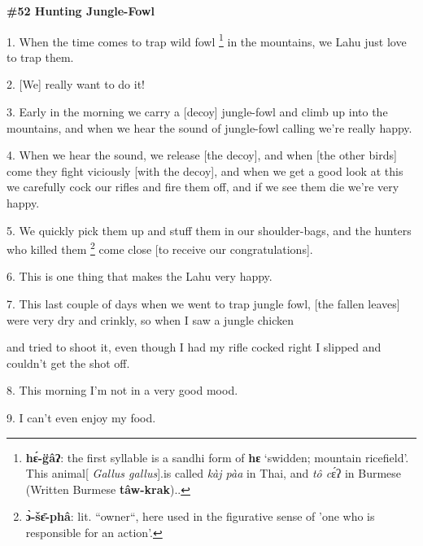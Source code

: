 
\textbf{\#52 Hunting Jungle-Fowl}

1. When the time comes to trap wild fowl \footnote{\textbf{hɛ́-g̈âʔ}: the first syllable is a sandhi form of \textbf{hɛ} `swidden; mountain ricefield'.  This animal[ \textit{Gallus gallus}].is called \textit{kàj pàa} in Thai, and  \textit{tô c}ɛ́ʔ in Burmese (Written Burmese \textbf{tâw-krak})..} in the mountains, we Lahu just love
to trap them.

2. [We] really want to do it!

3. Early in the morning we carry a [decoy] jungle-fowl and climb up into the mountains,
and when we hear the sound of jungle-fowl calling we're really happy.

4. When we hear the sound, we release [the decoy], and when [the other birds] come
they fight viciously [with the decoy], and when we get a good look at this we carefully
cock our rifles and fire them off, and if we see them die we're very happy.

5. We quickly pick them up and stuff them in our shoulder-bags, and the hunters
who killed them \footnote{\textbf{ɔ̀-šɛ̄-phâ}: lit. ``owner``, here used in the figurative sense of 'one who is responsible for an action'.} come close [to receive our congratulations].

6. This is one thing that makes the Lahu very happy.

7. This last couple of days when we went to trap jungle fowl,  [the fallen leaves]
were very dry and crinkly, so when I saw a jungle chicken

and tried to shoot it, even though I had my rifle cocked right I slipped and couldn't
get the shot off.

8. This morning I'm not in a very good mood.

9. I can't even enjoy my food.


